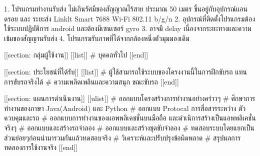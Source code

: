 1. โปรแกรมทำงานรับส่ง ไม่เกินรัศมีของสัญญาณไร้สาย ประมาณ 50 เมตร ขึ้นอยู่กับอุปกรณ์แอนดรอย และ ระยะส่ง Linklt Smart 7688 Wi-Fi 802.11 b/g/n
2. อุปกรณ์ที่ติดตั้งโปรแกรมต้องใช้ระบบปฎิบัติการ android และต้องมีเซนเซอร์ gyro 
3. อาจมี delay เนื่องจากระยะทางและความเข้มของสัญญานรับส่ง
4. โปรแกรมรับภาพที่ได้จากกล้องหนึ่งตัวมุมมองเดิม

[[section: กลุ่มผู้ใช้งาน]] 
[[list]]
# บุคคลทั่วไป
[[end]]

[[section: ประโยชน์ที่ได้รับ]] 
[[list]]
    # ผู้ใช้สามารถใช้ระบบของโครงงานนี้ในการฝึกขับรถ แทนการขับรถจริงได้
    # ความเพลิดเพลินและความสนุก ขณะขับรถ
[[end]]

[[section: แผนการดำเนินงาน]] 
[[ulist]]
# ออกแบบโครงสร้างการทำงานอย่างคร่าวๆ
# ศึกษาการทำงานของภาษา Java(Android) และ Python
# ออกแบบ Protocal การสื่อสารระหว่าง ตัวควบคุมและรถ
# ออกแบบการทำงานของแอพพลิเคชชั่นบนมือถือ และดำเนิการสร้างเป็นแอพพลิเคชั่นจริงๆ
# ออกแบบและสร้างรถจำลอง
# ออกแบบและสร้างชุดขับจำลอง
# ทดสอบระบบโดยแยกเป็นส่วนย่อยๆก่อนนำมารวมกันแล้วทดสอบจริง
# วิเคราะห์และปรับปรุงข้อผิดพลาด
# สรุปผลการทดลองการใช้งานจริง
[[end]]



